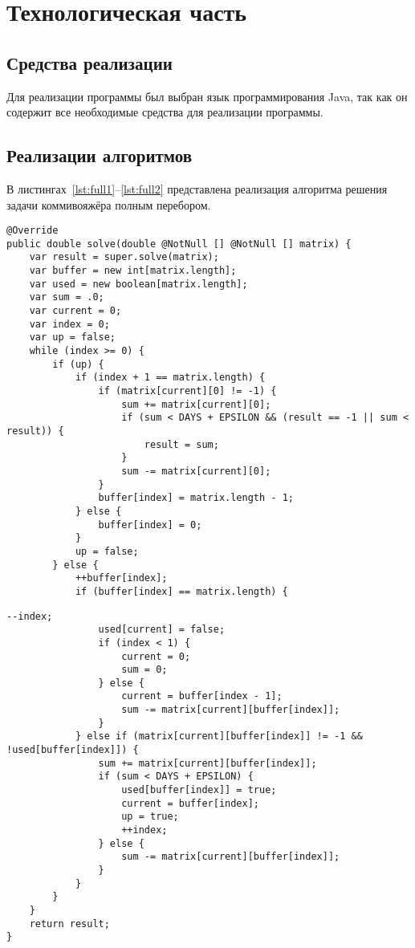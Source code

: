 \chapter{Технологическая часть}

\section{Средства реализации}

Для реализации программы был выбран язык программирования Java, так как он содержит все необходимые средства для реализации программы. 

\section{Реализации алгоритмов}

В листингах~\ref{lst:full1}--\ref{lst:full2} представлена реализация алгоритма решения задачи коммивояжёра полным перебором.

\begin{lstlisting}[label=lst:full1,caption=Реализация алгоритма решения задачи коммивояжёра полным перебором (начало)]
@Override
public double solve(double @NotNull [] @NotNull [] matrix) {
	var result = super.solve(matrix);
	var buffer = new int[matrix.length];
	var used = new boolean[matrix.length];
	var sum = .0;
	var current = 0;
	var index = 0;
	var up = false;
	while (index >= 0) {
		if (up) {
			if (index + 1 == matrix.length) {
				if (matrix[current][0] != -1) {
					sum += matrix[current][0];
					if (sum < DAYS + EPSILON && (result == -1 || sum < result)) {
						result = sum;
					}
					sum -= matrix[current][0];
				}
				buffer[index] = matrix.length - 1;
			} else {
				buffer[index] = 0;
			}
			up = false;
		} else {
			++buffer[index];
			if (buffer[index] == matrix.length) {
\end{lstlisting}

\begin{lstlisting}[label=lst:full2,caption=Реализация алгоритма решения задачи коммивояжёра полным перебором (окончание)]
				--index;
				used[current] = false;
				if (index < 1) {
					current = 0;
					sum = 0;
				} else {
					current = buffer[index - 1];
					sum -= matrix[current][buffer[index]];
				}
			} else if (matrix[current][buffer[index]] != -1 && !used[buffer[index]]) {
				sum += matrix[current][buffer[index]];
				if (sum < DAYS + EPSILON) {
					used[buffer[index]] = true;
					current = buffer[index];
					up = true;
					++index;
				} else {
					sum -= matrix[current][buffer[index]];
				}
			}
		}
	}
	return result;
}
\end{lstlisting}

